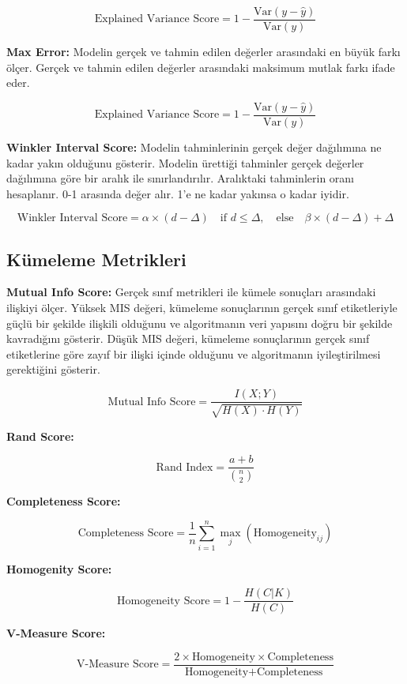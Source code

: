 \[\text{Explained Variance Score} = 1 - \frac{\text{Var}(y - \hat{y})}{\text{Var}(y)}\]

\textbf{Max Error:} Modelin gerçek ve tahmin edilen değerler arasındaki en büyük farkı ölçer. Gerçek ve tahmin edilen değerler arasındaki maksimum mutlak farkı ifade eder.

\[\text{Explained Variance Score} = 1 - \frac{\text{Var}(y - \hat{y})}{\text{Var}(y)}\]

\textbf{Winkler Interval Score:} Modelin tahminlerinin gerçek değer dağılımına ne kadar yakın olduğunu gösterir. Modelin ürettiği tahminler gerçek değerler dağılımına göre bir aralık ile sınırlandırılır. Aralıktaki tahminlerin oranı hesaplanır. 0-1 arasında değer alır. 1'e ne kadar yakınsa o kadar iyidir.

\[\text{Winkler Interval Score} = \alpha \times (d - \Delta) \quad \text{if } d \leq \Delta, \quad \text{else} \quad \beta \times (d - \Delta) + \Delta\]

\subsection{Kümeleme Metrikleri}

\textbf{Mutual Info Score:} Gerçek sınıf metrikleri ile kümele sonuçları arasındaki ilişkiyi ölçer. Yüksek MIS değeri, kümeleme sonuçlarının gerçek sınıf etiketleriyle güçlü bir şekilde ilişkili olduğunu ve algoritmanın veri yapısını doğru bir şekilde kavradığını gösterir. Düşük MIS değeri, kümeleme sonuçlarının gerçek sınıf etiketlerine göre zayıf bir ilişki içinde olduğunu ve algoritmanın iyileştirilmesi gerektiğini gösterir.

\[\text{Mutual Info Score} = \frac{I(X;Y)}{\sqrt{H(X) \cdot H(Y)}}\]

\textbf{Rand Score:}

\[\text{Rand Index} = \frac{a + b}{\binom{n}{2}}\]

\textbf{Completeness Score:}

\[\text{Completeness Score} = \frac{1}{n} \sum_{i=1}^{n} \max_j (\text{Homogeneity}_{ij})\]

\textbf{Homogenity Score:}

\[\text{Homogeneity Score} = 1 - \frac{H(C|K)}{H(C)}\]

\textbf{V-Measure Score:}

\[\text{V-Measure Score} = \frac{2 \times \text{Homogeneity} \times \text{Completeness}}{\text{Homogeneity} + \text{Completeness}}\]

\newpage